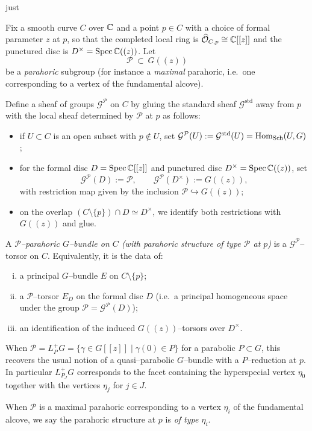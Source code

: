 just \documentclass[12pt]{article}
\begin{document}
\begin{definition}
\label{def:parahoric-torsor}
Fix a smooth curve $C$ over $\mathbb{C}$ and a point $p\in C$ with a choice of formal
parameter $z$ at $p$, so that the completed local ring is $\widehat{\mathcal O}_{C,p}\cong\mathbb{C}[[z]]$
and the punctured disc is $D^\times=\operatorname{Spec}\mathbb{C}((z))$.
Let
\[
\mathcal P\ \subset\ G((z))
\]
be a \emph{parahoric} subgroup (for instance a \emph{maximal} parahoric, i.e.\ one
corresponding to a vertex of the fundamental alcove).

Define a sheaf of groups $\mathcal G^{\mathcal P}$ on $C$ by gluing the standard
sheaf $\mathcal G^{\mathrm{std}}$ away from $p$ with the local sheaf determined by
$\mathcal P$ at $p$ as follows:
\begin{itemize}
\item if $U\subset C$ is an open subset with $p\notin U$, set
\(\mathcal G^{\mathcal P}(U):=\mathcal G^{\mathrm{std}}(U)=\operatorname{Hom}_{\mathrm{Sch}}(U,G)\);
\item for the formal disc $D=\operatorname{Spec}\mathbb{C}[[z]]$ and punctured disc $D^\times=\operatorname{Spec}\mathbb{C}((z))$, set
\[
\mathcal G^{\mathcal P}(D):=\mathcal P,\qquad \mathcal G^{\mathcal P}(D^\times):=G((z)),
\]
with restriction map given by the inclusion $\mathcal P\hookrightarrow G((z))$;
\item on the overlap $(C\setminus\{p\})\cap D \simeq D^\times$, we identify both
restrictions with $G((z))$ and glue.
\end{itemize}

A \emph{$\mathcal P$--parahoric $G$--bundle on $C$ (with parahoric structure of type $\mathcal P$ at $p$)} is a
$\mathcal G^{\mathcal P}$--torsor on $C$.
Equivalently, it is the data of:
\begin{enumerate}[(i)]
\item a principal $G$--bundle $E$ on $C\setminus\{p\}$;
\item a $\mathcal P$--torsor $E_D$ on the formal disc $D$ (i.e.\ a principal homogeneous space under the group
$\mathcal P=\mathcal G^{\mathcal P}(D)$);
\item an identification of the induced $G((z))$--torsors over $D^\times$.
\end{enumerate}

When $\mathcal P=L^+_P G=\{\gamma\in G[[z]]\mid \gamma(0)\in P\}$ for a parabolic $P\subset G$, this recovers the usual notion
of a quasi--parabolic $G$--bundle with a $P$--reduction at $p$. 
In particular $L^+_{P_J}G$ corresponds to the facet containing the hyperspecial vertex $\eta_0$ together with the vertices $\eta_j$ for $j\in J$.


When $\mathcal P$ is a maximal parahoric corresponding to a vertex $\eta_i$ of the fundamental alcove, we say the parahoric structure at $p$ is \emph{of type $\eta_i$}.
\end{definition}
\end{document}
